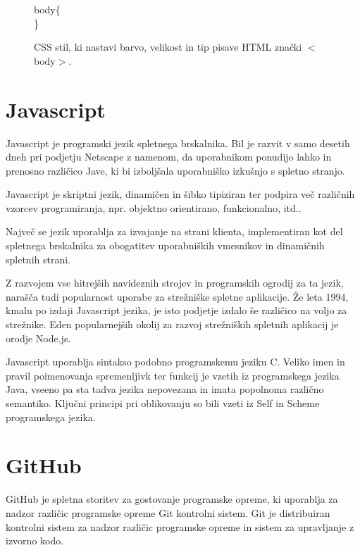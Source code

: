 \documentclass[a4paper, 12pt]{book}
\begin{document}
\begin{figure}
body\{\\
\}
\caption{CSS stil, ki nastavi barvo, velikost in tip pisave HTML zna\v cki $<$body$>$.}
\label{fig:css stil}
\end{figure}

\section{Javascript}
Javascript je programski jezik spletnega brskalnika. Bil je razvit v samo desetih dneh pri podjetju Netscape z namenom, da uporabnikom ponudijo lahko in prenosno razli\v cico Jave, ki bi izbolj\v sala uporabni\v sko izku\v snjo s spletno stranjo. 

Javascript je skriptni jezik, dinami\v cen in \v sibko tipiziran ter podpira ve\v c razli\v cnih vzorcev programiranja, npr. objektno orientirano, funkcionalno, itd.. 

Najve\v c se jezik uporablja za izvajanje na strani klienta, implementiran kot del spletnega brskalnika za obogatitev uporabni\v skih vmesnikov in dinami\v cnih spletnih strani. 

Z razvojem vse hitrej\v sih navideznih strojev in programskih ogrodij za ta jezik, nara\v s\v ca tudi popularnost uporabe za stre\v zni\v ske spletne aplikacije. \v Ze leta 1994, kmalu po izdaji Javascript jezika, je isto podjetje izdalo \v se razli\v cico na voljo za stre\v znike. Eden popularnej\v sih okolij za razvoj stre\v zni\v skih spletnih aplikacij je orodje Node.js.

Javascript uporablja sintakso podobno programskemu jeziku C. Veliko imen in pravil poimenovanja spremenljivk ter funkcij je vzetih iz programskega jezika Java, vseeno pa sta tadva jezika nepovezana in imata popolnoma razli\v cno semantiko. Klju\v cni principi pri oblikovanju so bili vzeti iz Self in Scheme programskega jezika. 

\section{GitHub}
\label{seq:github}
GitHub je spletna storitev za gostovanje programske opreme, ki uporablja za nadzor razli\v cic programske opreme Git kontrolni sistem. Git je distribuiran kontrolni sistem za nadzor razli\v cic programske opreme in sistem za upravljanje z izvorno kodo.
\end{document}
